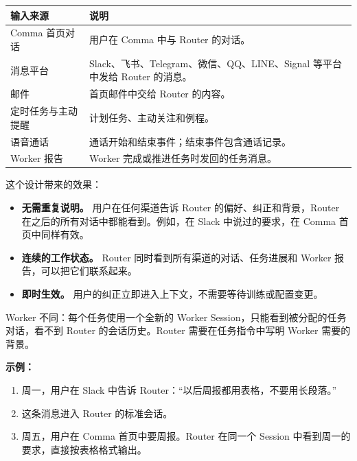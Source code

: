 \documentclass[UTF8,a4paper,11pt]{ctexart}
\begin{document}
\begin{longtable}{P{3.6cm}P{10.2cm}}
\toprule
输入来源 & 说明 \\
\midrule
\endhead
Comma 首页对话 & 用户在 Comma 中与 Router 的对话。 \\
消息平台 & Slack、飞书、Telegram、微信、QQ、LINE、Signal 等平台中发给 Router 的消息。 \\
邮件 & 首页邮件中交给 Router 的内容。 \\
定时任务与主动提醒 & 计划任务、主动关注和例程。 \\
语音通话 & 通话开始和结束事件；结束事件包含通话记录。 \\
Worker 报告 & Worker 完成或推进任务时发回的任务消息。 \\
\bottomrule
\end{longtable}

这个设计带来的效果：

\begin{itemize}
  \item \textbf{无需重复说明。} 用户在任何渠道告诉 Router 的偏好、纠正和背景，Router 在之后的所有对话中都能看到。例如，在 Slack 中说过的要求，在 Comma 首页中同样有效。
  \item \textbf{连续的工作状态。} Router 同时看到所有渠道的对话、任务进展和 Worker 报告，可以把它们联系起来。
  \item \textbf{即时生效。} 用户的纠正立即进入上下文，不需要等待训练或配置变更。
\end{itemize}

Worker 不同：每个任务使用一个全新的 Worker Session，只能看到被分配的任务对话，看不到 Router 的会话历史。Router 需要在任务指令中写明 Worker 需要的背景。

\textbf{示例：}

\begin{enumerate}
  \item 周一，用户在 Slack 中告诉 Router：“以后周报都用表格，不要用长段落。”
  \item 这条消息进入 Router 的标准会话。
  \item 周五，用户在 Comma 首页中要周报。Router 在同一个 Session 中看到周一的要求，直接按表格格式输出。
\end{enumerate}
\end{document}
